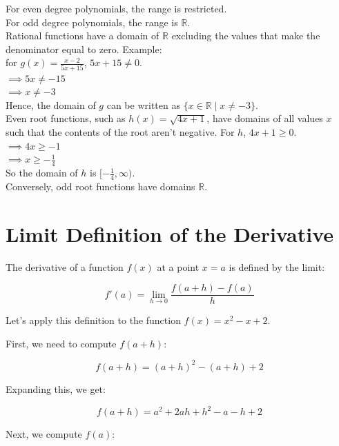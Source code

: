 \documentclass[12pt]{article}
\begin{document}
For even degree polynomials, the range is restricted.\\

For odd degree polynomials, the range is \(\mathbb{R}\).\\

Rational functions have a domain of \(\mathbb{R}\) excluding the values that make the denominator equal to zero. Example:\\

for \(g(x)=\frac{x-2}{5x+15}\), \(5x+15 \neq 0 \).\\

\(\implies 5x\neq-15\)\\

\(\implies x \neq -3\)\\

Hence, the domain of \(g\) can be written as \(\{ x \in \mathbb{R} \mid x\neq-3\}\).\\

Even root functions, such as \(h(x)=\sqrt{4x+1}\), have domains of all values \(x\) such that the contents of the root aren't negative. For \(h\), \(4x+1\geq0.\)\\

\(\implies 4x\geq-1\)\\

\(\implies x\geq-\frac{1}{4}\)\\

So the domain of \(h\) is \([-\frac{1}{4},\infty)\).\\

Conversely, odd root functions have domains \(\mathbb{R}\).

\section{Limit Definition of the Derivative}
The derivative of a function \( f(x) \) at a point \( x = a \) is defined by the limit:

\[
f'(a) = \lim_{{h \to 0}} \frac{f(a+h) - f(a)}{h}
\]

Let's apply this definition to the function \( f(x) = x^2 - x + 2 \).

First, we need to compute \( f(a+h) \):

\[
f(a+h) = (a+h)^2 - (a+h) + 2
\]

Expanding this, we get:

\[
f(a+h) = a^2 + 2ah + h^2 - a - h + 2
\]

Next, we compute \( f(a) \):
\end{document}
